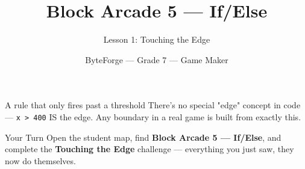 \documentclass[aspectratio=169]{beamer}
\title{Block Arcade 5 — If/Else}
\subtitle{Lesson 1: Touching the Edge}
\author{ByteForge --- Grade 7 --- Game Maker}
\date{}
\begin{document}
\begin{frame}
    \titlepage
\end{frame}

\begin{frame}{A rule that only fires past a threshold}
    \Large
    There's no special "edge" concept in code — \texttt{x > 400} IS the edge. Any boundary in a real game is built from exactly this.
\end{frame}

\begin{frame}{Your Turn}
    \Large
    Open the student map, find \textbf{Block Arcade 5 — If/Else}, and complete
    the \textbf{Touching the Edge} challenge --- everything you just saw, they now do themselves.
\end{frame}
\end{document}
